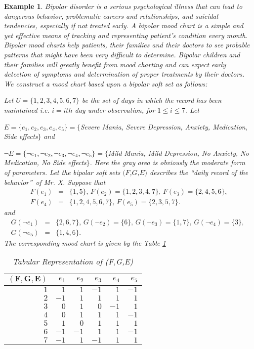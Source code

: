 \documentclass{amsart}
\theoremstyle{plain}
\newtheorem{example}{Example}
\numberwithin{equation}{section}
\begin{document}
\begin{example}
Bipolar disorder is a serious psychological illness that can lead to
dangerous behavior, problematic careers and relationships, and suicidal
tendencies, especially if not treated early. A bipolar mood chart is a
simple and yet effective means of tracking and representing patient's
condition every month. Bipolar mood charts help patients, their families and
their doctors to see probable patterns that might have been very difficult
to determine. Bipolar children and their families will greatly benefit from
mood charting and can expect early detection of symptoms and determination
of proper treatments by their doctors. We construct a mood chart based upon
a bipolar soft set as follows:

Let $U=\{1,2,3,4,5,6,7\}$ be the set of days in which the record has been
maintained i.e. $i=ith$ day under observation, for $1\leq i\leq 7$. Let

$E=\{e_{1},e_{2},e_{3},e_{4},e_{5}\}=\{$Severe Mania, Severe Depression,
Anxiety, Medication, Side effects$\}$ and

$\lnot E=\{\lnot e_{1},\lnot e_{2},\lnot e_{3},\lnot e_{4},\lnot e_{5}\}=\{$Mild Mania, Mild Depression, No Anxiety, No Medication, No Side effects$\}$.
Here the gray area is obviously the moderate form of parameters. Let the
bipolar soft sets $(F$,$G$,$E)$ describes the \textquotedblleft daily record
of the behavior\textquotedblright\ of Mr. X. Suppose that\begin{eqnarray*}
F(e_{1}) &=&\{1,5\}\text{, }F(e_{2})=\{1,2,3,4,7\}\text{, }F(e_{3})=\{2,4,5,6\}\text{,} \\
F(e_{4}) &=&\{1,2,4,5,6,7\}\text{, }F(e_{5})=\{2,3,5,7\}\text{.}
\end{eqnarray*}and\begin{eqnarray*}
G(\lnot e_{1}) &=&\{2,6,7\}\text{, }G(\lnot e_{2})=\{6\}\text{, }G(\lnot
e_{3})=\{1,7\}\text{, }G(\lnot e_{4})=\{3\}\text{, } \\
G(\lnot e_{5}) &=&\{1,4,6\}\text{.}
\end{eqnarray*}The corresponding mood chart is given by the Table \ref{TableKey}

\begin{table}[h] \centering\begin{tabular}[t]{|r|r|r|r|r|r|}
\hline
$\mathbf{(F,G,E)}$ & $e_{1}$ & $e_{2}$ & $e_{3}$ & $e_{4}$ & $e_{5}$ \\ 
\hline
$1$ & $1$ & $1$ & $-1$ & $1$ & $-1$ \\ \hline
$2$ & $-1$ & $1$ & $1$ & $1$ & $1$ \\ \hline
$3$ & $0$ & $1$ & $0$ & $-1$ & $1$ \\ \hline
$4$ & $0$ & $1$ & $1$ & $1$ & $-1$ \\ \hline
$5$ & $1$ & $0$ & $1$ & $1$ & $1$ \\ \hline
$6$ & $-1$ & $-1$ & $1$ & $1$ & $-1$ \\ \hline
$7$ & $-1$ & $1$ & $-1$ & $1$ & $1$ \\ \hline
\end{tabular}\caption{Tabular Representation of (F,G,E)}\label{TableKey}\end{table}\end{example}
\end{document}
